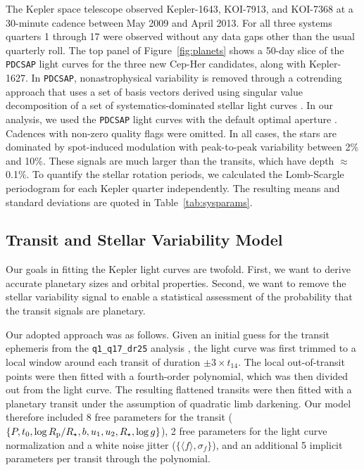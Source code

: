 \documentclass[12pt,twocolumn,linenumbers]{aastex63}
\begin{document}
The Kepler space telescope observed Kepler-1643, KOI-7913, and
KOI-7368 at a 30-minute cadence between May 2009 and April 2013.  For
all three systems quarters 1 through 17 were observed without any data
gaps other than the usual quarterly roll.  The top panel of
Figure~\ref{fig:planets} shows a 50-day slice of the \texttt{PDCSAP}
light curves for the three new Cep-Her candidates, along with
Kepler-1627.  In \texttt{PDCSAP}, nonastrophysical variability is
removed through a cotrending approach that uses a set of basis vectors
derived using singular value decomposition of a set of
systematics-dominated stellar light curves
\citep{smith_kepler_PDC_2017}.  In our analysis, we used the
\texttt{PDCSAP} light curves with the default optimal aperture
\citep{smith_finding_2016}.  Cadences with non-zero quality flags were
omitted.  In all cases, the stars are dominated by spot-induced
modulation with peak-to-peak variability between 2\% and 10\%.  These
signals are much larger than the transits, which have depth
$\approx$0.1\%.
To quantify the stellar rotation periods, we calculated the
Lomb-Scargle periodogram for each Kepler quarter independently.  The
resulting means and standard deviations are quoted in
Table~\ref{tab:sysparams}.


\subsection{Transit and Stellar Variability Model}

Our goals in fitting the Kepler light curves are twofold.  First, we
want to derive accurate planetary sizes and orbital properties.
Second, we want to remove the stellar variability signal to enable a
statistical assessment of the probability that the transit signals are
planetary.

Our adopted approach was as follows.  Given an initial guess for the
transit ephemeris from the \texttt{q1\_q17\_dr25} analysis
\citep{thompson_planetary_2018}, the light curve was first trimmed to
a local window around each transit of duration $\pm 3\times t_{14}$.
The local out-of-transit points were then fitted with a fourth-order
polynomial, which was then divided out from the light curve.  The
resulting flattened transits were then fitted with a 
planetary transit under the assumption of quadratic limb darkening.
Our model therefore included 8 free parameters for the transit ($\{P,
t_0, \log R_{\rm p}/R_\star, b, u_1 ,u_2, R_\star, \log g\}$), 2 free
parameters for the light curve normalization and a white noise jitter
($\{\langle f \rangle, \sigma_f \}$), and an additional 5 implicit
parameters per transit through the polynomial.
\end{document}
